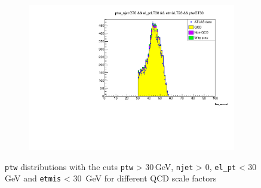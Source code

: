 \begin{figure}
\begin{subfigure}{0.5\textwidth}
            \includegraphics[width=\textwidth]{../W_mass/final_ptw_qcd0-37.pdf}
        \end{subfigure}
        \caption{\texttt{ptw} distributions with the cuts \texttt{ptw} > 30\,GeV, \texttt{njet} > 0, \texttt{el\_pt} < 30\, GeV and \texttt{etmis} < 30\, GeV for different QCD
        scale factors}
        \label{fig:final_ptw}
    \end{figure}

